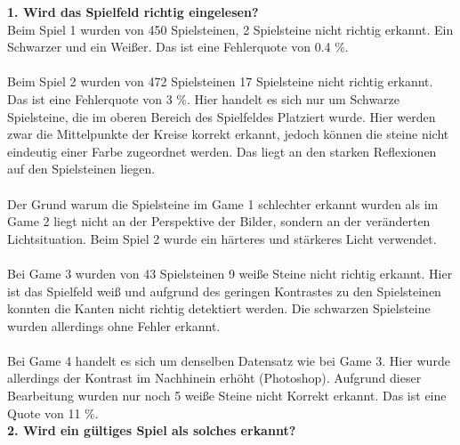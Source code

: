 \documentclass[paper=A4, deutsch]{scrartcl}
\begin{document}
\textbf{1. Wird das Spielfeld richtig eingelesen?} \\
Beim Spiel 1 wurden von 450 Spielsteinen, 2 Spielsteine nicht richtig erkannt. Ein Schwarzer und ein Weißer. Das ist eine Fehlerquote von 0.4 \%. \\
\\
Beim Spiel 2 wurden von 472 Spielsteinen 17 Spielsteine nicht richtig erkannt. Das ist eine Fehlerquote von 3 \%. Hier handelt es sich nur um Schwarze Spielsteine, die im oberen Bereich des Spielfeldes Platziert wurde. Hier werden zwar die Mittelpunkte der Kreise korrekt erkannt, jedoch können die steine nicht eindeutig einer Farbe zugeordnet werden. Das liegt an den starken Reflexionen auf den Spielsteinen liegen. \\ 
\\
Der Grund warum die Spielsteine im Game 1 schlechter erkannt wurden als im Game 2 liegt nicht an der Perspektive der Bilder, sondern an der veränderten Lichtsituation. Beim Spiel 2 wurde ein härteres und stärkeres Licht verwendet. \\
\\
Bei Game 3 wurden von 43 Spielsteinen 9 weiße Steine nicht richtig erkannt. Hier ist das Spielfeld weiß und aufgrund des geringen Kontrastes zu den Spielsteinen konnten die Kanten nicht richtig detektiert werden. Die schwarzen Spielsteine wurden allerdings ohne Fehler erkannt. \\
\\
Bei Game 4 handelt es sich um denselben Datensatz wie bei Game 3. Hier wurde allerdings der Kontrast im Nachhinein erhöht (Photoshop). Aufgrund dieser Bearbeitung wurden nur noch 5 weiße Steine nicht Korrekt erkannt. Das ist eine Quote von 11 \%.
\\



\textbf{2. Wird ein gültiges Spiel als solches erkannt?}
\\
\end{document}
